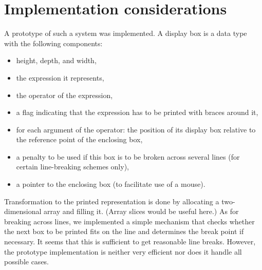 \section{Implementation considerations}

A prototype of such a system was implemented.
A display box is a data type with the following components:
\begin{itemize}
  \item height, depth, and width,
  \item the expression it represents,
  \item the operator of the expression,
  \item a flag indicating that the expression has to be printed
    with braces around it,
  \item for each argument of the operator: the position of its display
    box relative to the reference point of the enclosing box,
  \item a penalty to be used if this box is to be broken across several
    lines (for certain line-breaking schemes only),
  \item a pointer to the enclosing box (to facilitate use of a mouse).
\end{itemize}
Transformation to the printed representation is done by
allocating a two-dimensional array and filling it.
(Array slices would be useful here.)
As for breaking across lines, we implemented a simple mechanism that
checks whether the next box to be printed fits on the line and
determines the break point if necessary.
It seems that this is sufficient to get reasonable line breaks.
However, the prototype implementation is neither very efficient nor
does it handle all possible cases.



